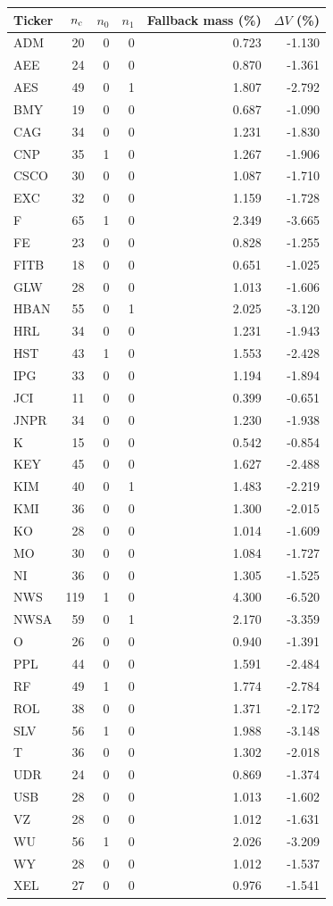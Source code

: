 \begin{tabular}{@{}lrrrrr@{}}
\toprule
Ticker & $n_{\rm c}$ & $n_0$ & $n_1$ & Fallback mass (\%) & $\Delta V$ (\%) \\
\midrule
ADM & 20 & 0 & 0 & 0.723 & -1.130 \\
AEE & 24 & 0 & 0 & 0.870 & -1.361 \\
AES & 49 & 0 & 1 & 1.807 & -2.792 \\
BMY & 19 & 0 & 0 & 0.687 & -1.090 \\
CAG & 34 & 0 & 0 & 1.231 & -1.830 \\
CNP & 35 & 1 & 0 & 1.267 & -1.906 \\
CSCO & 30 & 0 & 0 & 1.087 & -1.710 \\
EXC & 32 & 0 & 0 & 1.159 & -1.728 \\
F & 65 & 1 & 0 & 2.349 & -3.665 \\
FE & 23 & 0 & 0 & 0.828 & -1.255 \\
FITB & 18 & 0 & 0 & 0.651 & -1.025 \\
GLW & 28 & 0 & 0 & 1.013 & -1.606 \\
HBAN & 55 & 0 & 1 & 2.025 & -3.120 \\
HRL & 34 & 0 & 0 & 1.231 & -1.943 \\
HST & 43 & 1 & 0 & 1.553 & -2.428 \\
IPG & 33 & 0 & 0 & 1.194 & -1.894 \\
JCI & 11 & 0 & 0 & 0.399 & -0.651 \\
JNPR & 34 & 0 & 0 & 1.230 & -1.938 \\
K & 15 & 0 & 0 & 0.542 & -0.854 \\
KEY & 45 & 0 & 0 & 1.627 & -2.488 \\
KIM & 40 & 0 & 1 & 1.483 & -2.219 \\
KMI & 36 & 0 & 0 & 1.300 & -2.015 \\
KO & 28 & 0 & 0 & 1.014 & -1.609 \\
MO & 30 & 0 & 0 & 1.084 & -1.727 \\
NI & 36 & 0 & 0 & 1.305 & -1.525 \\
NWS & 119 & 1 & 0 & 4.300 & -6.520 \\
NWSA & 59 & 0 & 1 & 2.170 & -3.359 \\
O & 26 & 0 & 0 & 0.940 & -1.391 \\
PPL & 44 & 0 & 0 & 1.591 & -2.484 \\
RF & 49 & 1 & 0 & 1.774 & -2.784 \\
ROL & 38 & 0 & 0 & 1.371 & -2.172 \\
SLV & 56 & 1 & 0 & 1.988 & -3.148 \\
T & 36 & 0 & 0 & 1.302 & -2.018 \\
UDR & 24 & 0 & 0 & 0.869 & -1.374 \\
USB & 28 & 0 & 0 & 1.013 & -1.602 \\
VZ & 28 & 0 & 0 & 1.012 & -1.631 \\
WU & 56 & 1 & 0 & 2.026 & -3.209 \\
WY & 28 & 0 & 0 & 1.012 & -1.537 \\
XEL & 27 & 0 & 0 & 0.976 & -1.541 \\
\bottomrule
\end{tabular}

